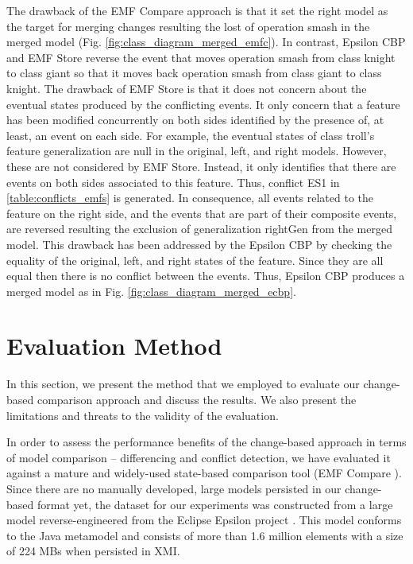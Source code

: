 The drawback of the EMF Compare approach is that it set the right model as the target for merging changes resulting the lost of operation \textsf{smash} in the merged model (Fig. \ref{fig:class_diagram_merged_emfc}). In contrast, Epsilon CBP and EMF Store reverse the event that moves operation \textsf{smash} from class \textsf{knight} to class \textsf{giant} so that it moves back operation \textsf{smash} from class \textsf{giant} to class \textsf{knight}. The drawback of EMF Store is that it does not concern about the eventual states produced by the conflicting events. It only concern that a feature has been modified concurrently on both sides identified by the presence of, at least, an event on each side. For example, the eventual states of class \textsf{troll}'s feature \textsf{generalization} are \textsf{null} in the original, left, and right models. However, these are not considered by EMF Store. Instead, it only identifies that there are events on both sides associated to this feature. Thus, conflict \textsf{ES1} in \ref{table:conflicts_emfs} is generated. In consequence, all events related to the feature on the right side, and the events that are part of their composite events, are reversed resulting the exclusion of generalization \textsf{rightGen} from the merged model. This drawback has been addressed by the Epsilon CBP by checking the equality of the original, left, and right states of the feature. Since they are all equal then there is no conflict between the events. Thus, Epsilon CBP produces a merged model as in Fig. \ref{fig:class_diagram_merged_ecbp}.


\section{Evaluation Method}
\label{sec:evaluation}
In this section, we present the method that we employed to evaluate our change-based comparison approach and discuss the results. We also present the limitations and threats to the validity of the evaluation.

In order to assess the performance benefits of the change-based approach in terms of model comparison -- differencing and conflict detection, we have evaluated it against a mature and widely-used state-based comparison tool (EMF Compare \cite{emfcompare2018developer,eclipse2017compare}). Since there are no manually developed, large models persisted in our change-based format yet, the dataset for our experiments was constructed from a large model reverse-engineered from the Eclipse Epsilon project \cite{eclipse2018epsilongit,eclipse2017epsilon}. This model conforms to the Java metamodel \cite{eclipse2018modiscojava} and consists of more than 1.6 million elements with a size of 224 MBs when persisted in XMI. 

